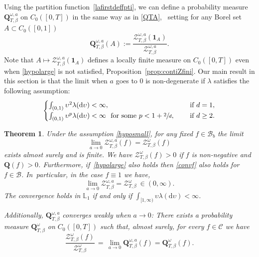 \documentclass[JEP,XML,SOM,Unicode,published]{cedram}
\let\mathcal\mathscr
\newtheorem{theorem}{Theorem}[section]
\theoremstyle{definition}
\newcommand{\dd}{\mathrm{d}}
\newcommand{\ind}{\mathbf{1}}
\newcommand{\cB}{{\ensuremath{\mathcal B}} }
\newcommand{\cC}{{\ensuremath{\mathcal C}} }
\newcommand{\cZ}{{\ensuremath{\mathcal Z}} }
\newcommand{\bQ}{{\ensuremath{\mathbf Q}} }
\newcommand{\bbL}{{\ensuremath{\mathbb L}} }
\let\gl\lambda
\let\ups\upsilon
\let\go\omega
\begin{document}
 Using the partition function~\eqref{lafirstdeffpti}, we can define a probability measure $\bQ^{\go,a}_{T,\beta}$ on $C_0([0,T])$ in the same way as in \eqref{QTA}, \ie \ setting for any Borel set $A\subset C_0([0,1])$ \,
\[
\bQ^{\go,a}_{T,\beta}(A):= \frac{\cZ^{\go,a}_{T,\beta}(\ind_{A})}{ \cZ^{\go,a}_{T,\beta} }.
\]
Note that $A\mapsto \cZ^{\go,a}_{T,\beta}(\ind_{A})$ defines a locally finite measure on $C_0([0,T])$ even when \eqref{hypolarge} is not satisfied, \cf Proposition~\ref{prop:contiZfini}.
Our main result in this section is that the limit when $a$ goes to $0$ is non-degenerate if $\gl$ satisfies the following assumption:
\begin{equation}\label{hyposmall}
\begin{cases}
\int_{(0,1)} \ups^{2} \gl(\dd \ups)<\infty, \quad &\text{ if } d=1,\\
\int_{(0,1)} \ups^{p} \gl(\dd \ups)<\infty \ \text{ for some } p<1+\sfrac{2}{d}, \quad &\text{ if } d\ge 2.
\end{cases}
\end{equation}

\begin{theorem}\label{thm:zalpha}
Under the assumption \eqref{hyposmall}, for any fixed $f\in \cB_b$ the limit
\begin{equation}\label{convf}
\lim_{a\to 0}\cZ^{\go,a}_{T,\beta}(f)= \cZ^{\go}_{T,\beta}(f)
\end{equation}
exists almost surely and is finite. We have $\cZ^{\go}_{T,\beta}(f)>0$ if $f$ is non-negative and $\bQ(f)>0$.
Furthermore, if~\eqref{hypolarge} also holds then \eqref{convf} also holds for $f\in \mathcal B$. In~particular, in the case $f\equiv 1$ we have,
\begin{equation}\label{convparty}
\lim_{a\to 0}\cZ^{\go,a}_{T,\beta}= \cZ^{\go}_{T,\beta} \ \in (0,\infty).
\end{equation}
The convergence holds in $\bbL_1$ if and only if $\int_{[1,\infty)} \ups \gl(\dd \ups)<\infty$.

 Additionally, $\bQ^{\go,a}_{T,\beta}$ converges weakly when $a\to 0$: There exists a probability measure $\bQ^{\go}_{T,\beta}$ on $C_0([0,T])$ such that, almost surely, for every
$f\in \cC$ we have
\begin{equation}\label{lescontis}
\frac{ \cZ^{\go}_{T,\beta}(f)}{ \cZ^{\go}_{T,\beta}}\, =\, \lim_{a\to 0}\bQ^{\go,a}_{T,\beta}(f)= \bQ^{\go}_{T,\beta}(f).
\end{equation}
\end{theorem}
\end{document}
